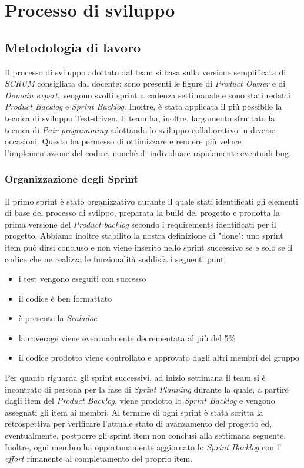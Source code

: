 \chapter{Processo di sviluppo}\label{ch:processo-di-sviluppo}
\section{Metodologia di lavoro}\label{sec:metodologia-di-lavoro}
Il processo di sviluppo adottato dal team si basa sulla versione semplificata di \textit{SCRUM} consigliata dal docente:
sono presenti le figure di \textit{Product Owner} e di \textit{Domain expert}, vengono svolti sprint a cadenza settimanale e sono stati redatti
\textit{Product Backlog} e \textit{Sprint Backlog}.
Inoltre, è stata applicata il più possibile la tecnica di sviluppo Test-driven.
Il team ha, inoltre, largamento sfruttato la tecnica di \textit{Pair programming} adottando lo sviluppo collaborativo in diverse occasioni.
Questo ha permesso di ottimizzare e rendere più veloce l'implementazione del codice, nonchè di individuare rapidamente eventuali bug.

\subsection{Organizzazione degli Sprint}\label{subsec:organizzazione-sprint}
Il primo sprint è stato organizzativo durante il quale stati identificati gli elementi di base del processo di svilppo, preparata la build del progetto e prodotta la prima versione del \textit{Product backlog}
secondo i requirements identificati per il progetto.
Abbiamo inoltre stabilito la nostra definizione di "done":
uno sprint item può dirsi concluso e non viene inserito nello sprint successivo se e solo se il codice che ne realizza le funzionalità soddisfa i seguenti punti
\begin{itemize}
    \item i test vengono eseguiti con successo
    \item il codice è ben formattato
    \item è presente la \textit{Scaladoc}
    \item la coverage viene eventualmente decrementata al più del 5\%
    \item il codice prodotto viene controllato e approvato dagli altri membri del gruppo
\end{itemize}
Per quanto riguarda gli sprint successivi, ad inizio settimana il team si è incontrato di persona per la fase di \textit{Sprint Planning} durante la quale, a partire dagli item del \textit{Product Backlog}, viene prodotto
lo \textit{Sprint Backlog} e vengono assegnati gli item ai membri.
Al termine di ogni sprint è stata scritta la retrospettiva per verificare l'attuale stato di avanzamento del progetto ed, eventualmente,
postporre gli sprint item non conclusi alla settimana seguente.
Inoltre, ogni membro ha opportunamente aggiornato lo \textit{Sprint Backlog} con l' \textit{effort} rimanente al completamento del proprio item.

